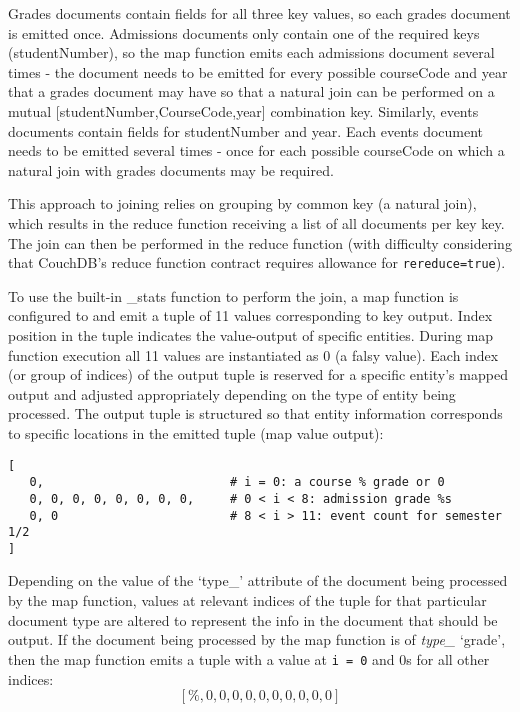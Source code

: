 Grades documents contain fields for all three key values, so each grades document is emitted once. Admissions documents only contain one of the required keys (studentNumber), so the map function emits each admissions document several times - the document needs to be emitted for every possible courseCode and year that a grades document may have so that a natural join can be performed on a mutual [studentNumber,CourseCode,year] combination key. Similarly, events documents contain fields for studentNumber and year. Each events document needs to be emitted several times - once for each possible courseCode on which a natural join with grades documents may be required.

This approach to joining relies on grouping by common key (a natural join), which results in the reduce function receiving a list of all documents per key key. The join can then be performed in the reduce function (with difficulty considering that CouchDB's reduce function contract requires allowance for \texttt{rereduce=true}).

To use the built-in \_stats function to perform the join, a map function is configured to and emit a tuple of 11 values corresponding to key output. Index position in the tuple indicates the value-output of specific entities. During map function execution all 11 values are instantiated as 0 (a falsy value). Each index (or group of indices) of the output tuple is reserved for a specific entity's mapped output and adjusted appropriately depending on the type of entity being processed. The output tuple is structured so that entity information corresponds to specific locations in the emitted tuple (map value output):

\begin{verbatim}
[
   0,                          # i = 0: a course % grade or 0
   0, 0, 0, 0, 0, 0, 0, 0,     # 0 < i < 8: admission grade %s
   0, 0                        # 8 < i > 11: event count for semester 1/2
]
\end{verbatim}

Depending on the value of the `type\_' attribute of the document being processed by the map function, values at relevant indices of the tuple for that particular document type are altered to represent the info in the document that should be output. If the document being processed by the map function is of \textit{type\_} ‘grade’, then the map function emits a tuple with a value at \texttt{i = 0} and 0s for all other indices: \[[\%, 0, 0, 0, 0, 0, 0, 0, 0, 0, 0]\]


